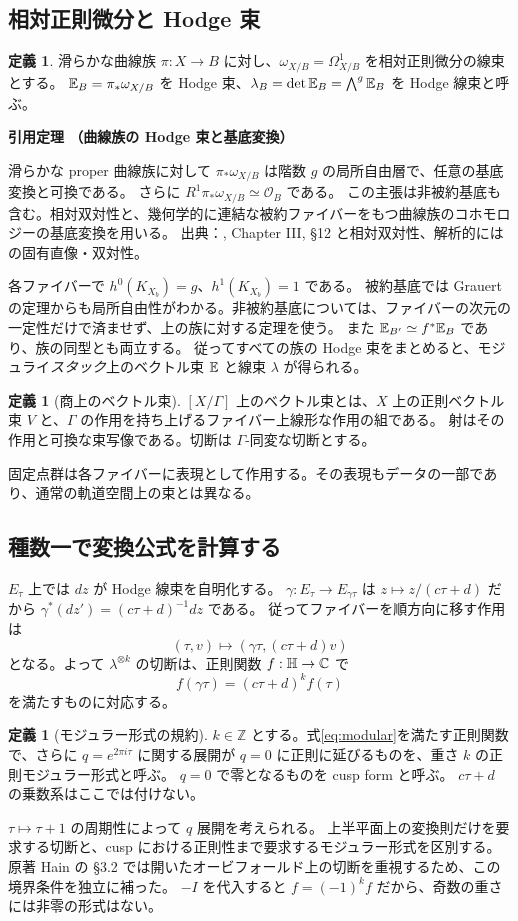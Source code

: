\documentclass[dvipdfmx,a4paper,11pt]{article}
\theoremstyle{definition}
\newtheorem{dfn}[thm]{定義}
\newcommand{\C}{\mathbb C}\newcommand{\R}{\mathbb R}\newcommand{\Z}{\mathbb Z}\newcommand{\Q}{\mathbb Q}
\newcommand{\OO}{\mathcal O}\newcommand{\MM}{\mathcal M}\newcommand{\TT}{\mathcal T}
\newenvironment{external}[1]{\Needspace{7\baselineskip}\refstepcounter{thm}\begin{tcolorbox}[mybox,colback=blue!2,colframe=blue!40!black]\textbf{引用定理 \thethm（#1）}\par}{\end{tcolorbox}}
\begin{document}
\subsection{相対正則微分と Hodge 束}
\begin{dfn}\label{def:hodge}
滑らかな曲線族 $\pi:X\to B$ に対し、$\omega_{X/B}=\Omega^1_{X/B}$ を相対正則微分の線束とする。
$\mathbb E_B=\pi_*\omega_{X/B}$ を Hodge 束、$\lambda_B=\det\mathbb E_B=\bigwedge^g\mathbb E_B$ を Hodge 線束と呼ぶ。
\end{dfn}
\begin{external}{曲線族の Hodge 束と基底変換}
滑らかな proper 曲線族に対して $\pi_*\omega_{X/B}$ は階数 $g$ の局所自由層で、任意の基底変換と可換である。
さらに $R^1\pi_*\omega_{X/B}\simeq\OO_B$ である。
この主張は非被約基底も含む。相対双対性と、幾何学的に連結な被約ファイバーをもつ曲線族のコホモロジーの基底変換を用いる。
出典：\cite{Hartshorne}, Chapter III, \S12 と相対双対性、解析的には \cite{Grauert} の固有直像・双対性。
\end{external}
各ファイバーで $h^0(K_{X_b})=g$、$h^1(K_{X_b})=1$ である。
被約基底では Grauert の定理からも局所自由性がわかる。非被約基底については、ファイバーの次元の一定性だけで済ませず、上の族に対する定理を使う。
また $\mathbb E_{B'}\simeq f^*\mathbb E_B$ であり、族の同型とも両立する。
従ってすべての族の Hodge 束をまとめると、モジュライ\emph{スタック}上のベクトル束 $\mathbb E$ と線束 $\lambda$ が得られる。

\begin{dfn}[商上のベクトル束]
$[X/\Gamma]$ 上のベクトル束とは、$X$ 上の正則ベクトル束 $V$ と、$\Gamma$ の作用を持ち上げるファイバー上線形な作用の組である。
射はその作用と可換な束写像である。切断は $\Gamma$-同変な切断とする。
\end{dfn}
固定点群は各ファイバーに表現として作用する。その表現もデータの一部であり、通常の軌道空間上の束とは異なる。

\subsection{種数一で変換公式を計算する}
$E_\tau$ 上では $dz$ が Hodge 線束を自明化する。
$\gamma:E_\tau\to E_{\gamma\tau}$ は $z\mapsto z/(c\tau+d)$ だから
$\gamma^*(dz')=(c\tau+d)^{-1}dz$ である。
従ってファイバーを順方向に移す作用は
\[
(\tau,v)\longmapsto(\gamma\tau,(c\tau+d)v)
\]
となる。よって $\lambda^{\otimes k}$ の切断は、正則関数 $f:\HH\to\C$ で
\begin{equation}\label{eq:modular}
f(\gamma\tau)=(c\tau+d)^k f(\tau)
\end{equation}
を満たすものに対応する。
\begin{dfn}[モジュラー形式の規約]
$k\in\Z$ とする。式\eqref{eq:modular}を満たす正則関数で、さらに $q=e^{2\pi i\tau}$ に関する展開が $q=0$ に正則に延びるものを、重さ $k$ の正則モジュラー形式と呼ぶ。
$q=0$ で零となるものを cusp form と呼ぶ。
$c\tau+d$ の乗数系はここでは付けない。
\end{dfn}
$\tau\mapsto\tau+1$ の周期性によって $q$ 展開を考えられる。
上半平面上の変換則だけを要求する切断と、cusp における正則性まで要求するモジュラー形式を区別する。
原著 Hain の \S3.2 では開いたオービフォールド上の切断を重視するため、この境界条件を独立に補った。
$-I$ を代入すると $f=(-1)^kf$ だから、奇数の重さには非零の形式はない。
\end{document}

